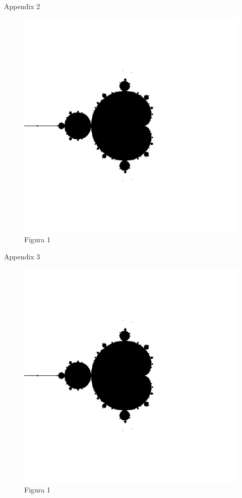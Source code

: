 \documentclass[11pt, aspectratio = 169]{beamer}
\begin{document}
    \begin{frame}{Appendix 2}
        \begin{figure}[H]
            \centering
            \caption{Figura 1}
            \includegraphics[scale = 0.3]{figura1.png}
        \end{figure}
    \end{frame}
    \begin{frame}{Appendix 3}
        \begin{figure}[H]
            \centering
            \caption{Figura 1}
            \includegraphics[scale = 0.3]{figura1.png}
        \end{figure}
    \end{frame}
    
\end{document}
